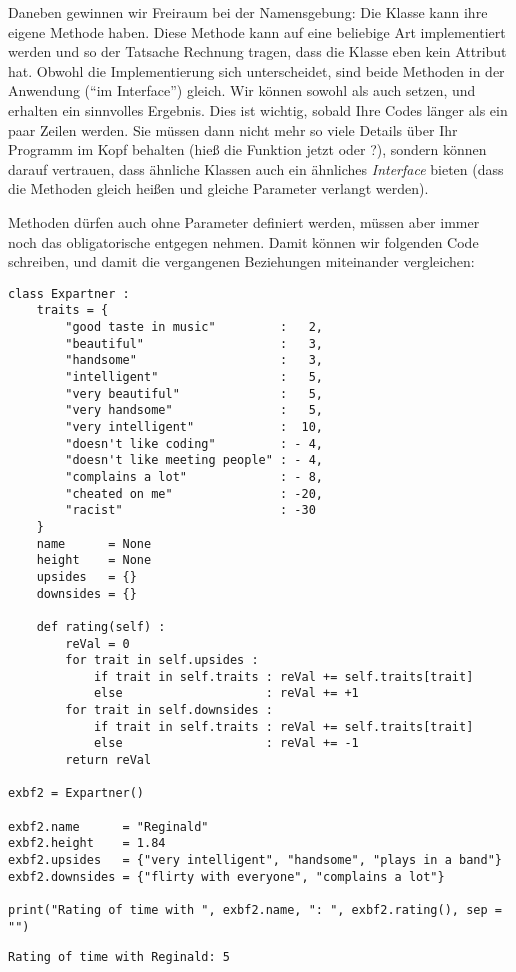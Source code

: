 Daneben gewinnen wir Freiraum bei der Namensgebung: Die Klasse  kann ihre eigene Methode  haben. Diese Methode kann auf eine beliebige Art implementiert werden und so der Tatsache Rechnung tragen, dass die Klasse  eben kein Attribut  hat. Obwohl die Implementierung sich unterscheidet, sind beide Methoden in der Anwendung (\enquote{im Interface}) gleich. Wir können sowohl  als auch  setzen, und erhalten ein sinnvolles Ergebnis. Dies ist wichtig, sobald Ihre Codes länger als ein paar Zeilen werden. Sie müssen dann nicht mehr so viele Details über Ihr Programm im Kopf behalten (hieß die Funktion jetzt  oder ?), sondern können darauf vertrauen, dass ähnliche Klassen auch ein ähnliches \emph{Interface} bieten (\ie dass die Methoden gleich heißen und gleiche Parameter verlangt werden).

Methoden dürfen auch ohne Parameter definiert werden, müssen aber immer noch das obligatorische  entgegen nehmen. Damit können wir folgenden Code schreiben, und damit die vergangenen Beziehungen miteinander vergleichen:
\begin{codebox}
\begin{verbatim}
class Expartner :
    traits = {
        "good taste in music"         :   2,
        "beautiful"                   :   3,
        "handsome"                    :   3,
        "intelligent"                 :   5,
        "very beautiful"              :   5,
        "very handsome"               :   5,
        "very intelligent"            :  10,
        "doesn't like coding"         : - 4,
        "doesn't like meeting people" : - 4,
        "complains a lot"             : - 8,
        "cheated on me"               : -20,
        "racist"                      : -30
    }
    name      = None
    height    = None
    upsides   = {}
    downsides = {}
    
    def rating(self) :
        reVal = 0
        for trait in self.upsides :
            if trait in self.traits : reVal += self.traits[trait]
            else                    : reVal += +1
        for trait in self.downsides :
            if trait in self.traits : reVal += self.traits[trait]
            else                    : reVal += -1
        return reVal

exbf2 = Expartner()

exbf2.name      = "Reginald"
exbf2.height    = 1.84
exbf2.upsides   = {"very intelligent", "handsome", "plays in a band"}
exbf2.downsides = {"flirty with everyone", "complains a lot"}

print("Rating of time with ", exbf2.name, ": ", exbf2.rating(), sep = "")
\end{verbatim}
\end{codebox}
\begin{cmdbox}
\begin{verbatim}
Rating of time with Reginald: 5
\end{verbatim}
\end{cmdbox}

